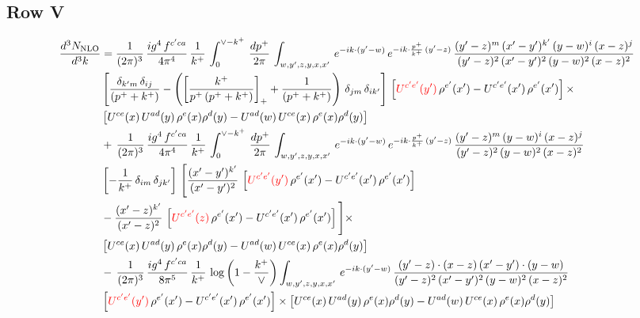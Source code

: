 \documentclass[9pt]{article}
\numberwithin{equation}{section}
\begin{document}
\subsection{Row V}
\begin{align}
    \frac{d^{3}N_{\rm NLO}}{d^{3}k} & =  \frac{1}{(2\pi)^{3}}\, \frac{ig^{4}\,f^{c'ca}}{4\pi^{4}}\, \frac{1}{k^{+}}\,\int_{0}^{\vee-k^{+}}\, \frac{dp^{+}}{2\pi}\, \int_{w,y',z,y,x,x'}\, e^{-ik\cdot (y'-w)}\, e^{-ik\cdot \frac{p^{+}}{k^{+}}\,(y'-z)}\,\frac{(y'-z)^{m}\,(x'-y')^{k'}\,(y-w)^{i}\,(x-z)^{j}}{(y'-z)^{2}\,(x'-y')^{2}\,(y-w)^{2}\,(x-z)^{2}}\notag \\ & \left[\frac{\delta_{k'm}\,\delta_{ij}}{(p^{+}+k^{+})}-\left(\left[\frac{k^{+}}{p^{+}\,(p^{+}+k^{+})}\right]_{+}+\frac{1}{(p^{+}+k^{+})}\right)\,\delta_{jm}\,\delta_{ik'}\right]\, \left[{\color{red}U^{c'e'}(y')}\,\rho^{e'}(x')-U^{c'e'}(x')\,\rho^{e'}(x')\right]\times \notag \\ &  \left[U^{ce}(x)\,U^{ad}(y)\,\rho^{e}(x)\rho^{d}(y)-U^{ad}(w)\,U^{ce}(x)\,\rho^{e}(x)\rho^{d}(y)\right] \notag \\
&   +\,\frac{1}{(2\pi)^{3}}\, \frac{ig^{4}\,f^{c'ca}}{4\pi^{4}}\, \frac{1}{k^{+}}\,\int_{0}^{\vee-k^{+}}\, \frac{dp^{+}}{2\pi}\, \int_{w,y',z,y,x,x'}\, e^{-ik\cdot (y'-w)}\, e^{-ik\cdot \frac{p^{+}}{k^{+}}\,(y'-z)}\,\frac{(y'-z)^{m}\,(y-w)^{i}\,(x-z)^{j}}{(y'-z)^{2}\,(y-w)^{2}\,(x-z)^{2}}\notag \\ &   \left[-\frac{1}{k^{+}}\, \delta_{im}\, \delta_{jk'}\right]\, \Bigg[\frac{(x'-y')^{k'}}{(x'-y')^{2}}\,\left[{\color{red}U^{c'e'}(y')}\,\rho^{e'}(x')-U^{c'e'}(x')\,\rho^{e'}(x')\right]\notag \\ & -\frac{(x'-z)^{k'}}{(x'-z)^{2}}\,\left[{\color{red}U^{c'e'}(z)}\,\rho^{e'}(x')-U^{c'e'}(x')\,\rho^{e'}(x')\right]\Bigg]\times \notag \\ &    \left[U^{ce}(x)\,U^{ad}(y)\,\rho^{e}(x)\rho^{d}(y)-U^{ad}(w)\,U^{ce}(x)\,\rho^{e}(x)\rho^{d}(y)\right] \notag \\
& -\,\frac{1}{(2\pi)^{3}}\, \frac{ig^{4}\,f^{c'ca}}{8\pi^{5}}\, \frac{1}{k^{+}}\,\log{\left(1-\frac{k^{+}}{\vee}\right)} \int_{w,y',z,y,x,x'}\, e^{-ik\cdot (y'-w)}\,\frac{(y'-z)\cdot (x-z)\,(x'-y')\cdot (y-w)}{(y'-z)^{2}\,(x'-y')^{2}\,(y-w)^{2}\,(x-z)^{2}}\notag \\ & \left[{\color{red}U^{c'e'}(y')}\,\rho^{e'}(x')-U^{c'e'}(x')\,\rho^{e'}(x')\right]\times  \left[U^{ce}(x)\,U^{ad}(y)\,\rho^{e}(x)\rho^{d}(y)-U^{ad}(w)\,U^{ce}(x)\,\rho^{e}(x)\rho^{d}(y)\right]
\end{align}
\end{document}
